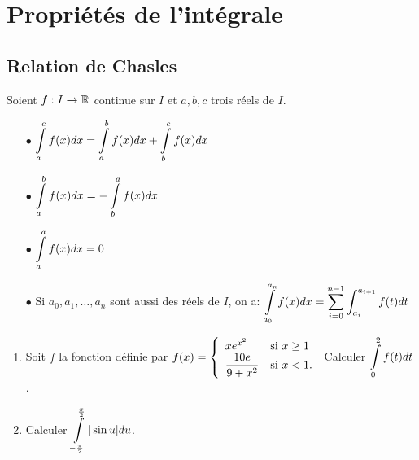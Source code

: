 \documentclass[a4paper, 11pt]{article}
\begin{document}
{%
\section{Propri\'et\'es de l'int\'egrale}
\vsec
\subsection{Relation de Chasles}

{  \vsec

	\begin{prop}
		Soient $f: I\rightarrow \mathbb{R}$ continue sur $I$ et $a,b,c$ trois r\'eels de $I$.
		\begin{itemize}
			\item[$\bullet$] $\displaystyle \int\limits_a^c f(x)dx =\int\limits_a^b f(x)dx +\int\limits_b^c f(x)dx $
			\item[$\bullet$] $\displaystyle \int\limits_a^b f(x)dx=-\int\limits_b^a f(x)dx $
			\item[$\bullet$] $\displaystyle \int\limits_a^a f(x)dx=0$
			\item[$\bullet$] Si $a_0,a_1,\dots,a_n$ sont aussi des r\'eels de $I$, on a: $\displaystyle\int\limits_{a_0}^{a_n} f(x)dx=\sum
				      _{i=0}^{n-1} \int_{a_i} ^{a_{i+1}} f(t) dt$
		\end{itemize}
	\end{prop}

}
{\footnotesize \begin{exo}
		\begin{enumerate}
			\item Soit $f$ la fonction d\'efinie par $f(x)=\left\lbrace\begin{array}{ll}  xe^{x^2} & \hbox{si}\ x\geq 1\\ \ddp\frac{10e}{9+x^2} &\hbox{si}\ x<1.   \end{array}\right.$ Calculer $\displaystyle \int\limits_0^2 f(t)dt$.
			      \vspace*{-0.5cm}
			\item Calculer $\displaystyle \int\limits_{-\frac{\pi}{2}}^{\frac{\pi}{2}} |\sin{u}|du$.
		\end{enumerate}
	\end{exo}}
\vsec
\vsec
}
\end{document}
